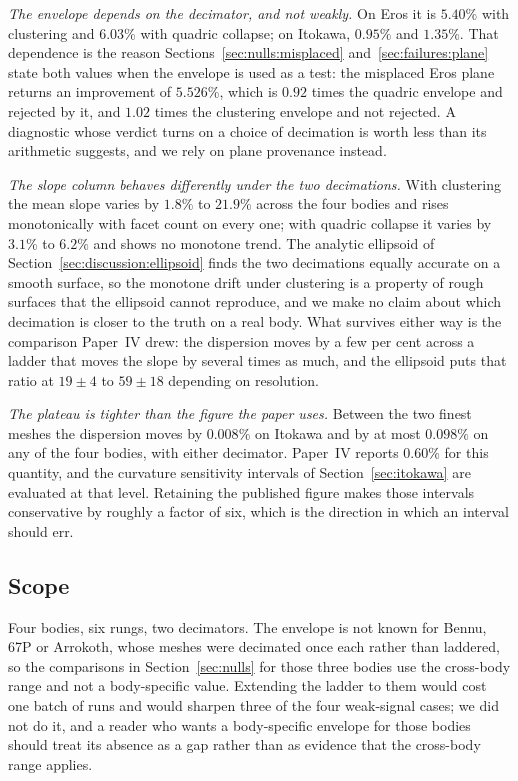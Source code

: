 \emph{The envelope depends on the decimator, and not weakly.} On Eros it is
$5.40\%$ with clustering and $6.03\%$ with quadric collapse; on Itokawa,
$0.95\%$ and $1.35\%$. That dependence is the reason
Sections~\ref{sec:nulls:misplaced} and~\ref{sec:failures:plane} state both
values when the envelope is used as a test: the misplaced Eros plane returns
an improvement of $5.526\%$, which is $0.92$ times the quadric envelope and
rejected by it, and $1.02$ times the clustering envelope and not rejected.
A diagnostic whose verdict turns on a choice of decimation is worth less than
its arithmetic suggests, and we rely on plane provenance instead.

\emph{The slope column behaves differently under the two decimations.} With
clustering the mean slope varies by $1.8\%$ to $21.9\%$ across the four
bodies and rises monotonically with facet count on every one; with quadric
collapse it varies by $3.1\%$ to $6.2\%$ and shows no monotone trend. The
analytic ellipsoid of Section~\ref{sec:discussion:ellipsoid} finds the two
decimations equally accurate on a smooth surface, so the monotone drift under
clustering is a property of rough surfaces that the ellipsoid cannot
reproduce, and we make no claim about which decimation is closer to the truth
on a real body. What survives either way is the comparison Paper~IV drew: the
dispersion moves by a few per cent across a ladder that moves the slope by
several times as much, and the ellipsoid puts that ratio at $19\pm4$ to
$59\pm18$ depending on resolution.

\emph{The plateau is tighter than the figure the paper uses.} Between the two
finest meshes the dispersion moves by $0.008\%$ on Itokawa and by at most
$0.098\%$ on any of the four bodies, with either decimator. Paper~IV reports
$0.60\%$ for this quantity, and the curvature sensitivity intervals of
Section~\ref{sec:itokawa} are evaluated at that level. Retaining the
published figure makes those intervals conservative by roughly a factor of
six, which is the direction in which an interval should err.

\subsection{Scope}
\label{app:envelope:scope}

Four bodies, six rungs, two decimators. The envelope is not known for Bennu,
67P or Arrokoth, whose meshes were decimated once each rather than laddered,
so the comparisons in Section~\ref{sec:nulls} for those three bodies use the
cross-body range and not a body-specific value. Extending the ladder to them
would cost one batch of runs and would sharpen three of the four
weak-signal cases; we did not do it, and a reader who wants a body-specific
envelope for those bodies should treat its absence as a gap rather than as
evidence that the cross-body range applies.
